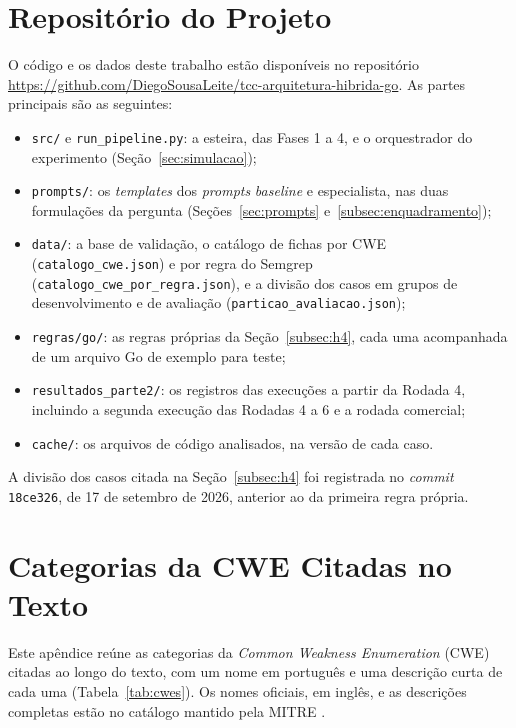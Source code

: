 \begin{apendicesenv}


\chapter{Repositório do Projeto}
\label{ap:repositorio}

O código e os dados deste trabalho estão disponíveis no repositório \url{https://github.com/DiegoSousaLeite/tcc-arquitetura-hibrida-go}. As partes principais são as seguintes:

\begin{itemize}
    \item \texttt{src/} e \texttt{run\_pipeline.py}: a esteira, das Fases 1 a 4, e o orquestrador do experimento (Seção~\ref{sec:simulacao});
    \item \texttt{prompts/}: os \textit{templates} dos \textit{prompts} \textit{baseline} e especialista, nas duas formulações da pergunta (Seções~\ref{sec:prompts} e~\ref{subsec:enquadramento});
    \item \texttt{data/}: a base de validação, o catálogo de fichas por CWE (\texttt{catalogo\_cwe.json}) e por regra do Semgrep (\texttt{catalogo\_cwe\_por\_regra.json}), e a divisão dos casos em grupos de desenvolvimento e de avaliação (\texttt{particao\_avaliacao.json});
    \item \texttt{regras/go/}: as regras próprias da Seção~\ref{subsec:h4}, cada uma acompanhada de um arquivo Go de exemplo para teste;
    \item \texttt{resultados\_parte2/}: os registros das execuções a partir da Rodada 4, incluindo a segunda execução das Rodadas 4 a 6 e a rodada comercial;
    \item \texttt{cache/}: os arquivos de código analisados, na versão de cada caso.
\end{itemize}

A divisão dos casos citada na Seção~\ref{subsec:h4} foi registrada no \textit{commit} \texttt{18ce326}, de 17 de setembro de 2026, anterior ao da primeira regra própria.

\chapter{Categorias da CWE Citadas no Texto}
\label{ap:cwes}

Este apêndice reúne as categorias da \textit{Common Weakness Enumeration} (CWE) citadas ao longo do texto, com um nome em português e uma descrição curta de cada uma (Tabela~\ref{tab:cwes}). Os nomes oficiais, em inglês, e as descrições completas estão no catálogo mantido pela MITRE \cite{mitrecwe}.


\end{apendicesenv}
